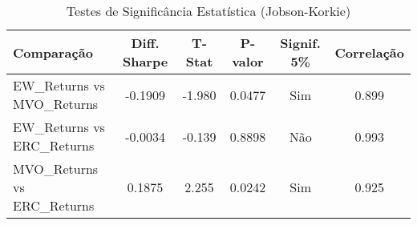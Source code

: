 
\begin{table}[H]
\centering
\caption{Testes de Significância Estatística (Jobson-Korkie)}
\label{tab:testes_estatisticos}
\begin{tabular}{|l|c|c|c|c|c|}
\hline
\textbf{Comparação} & \textbf{Diff. Sharpe} & \textbf{T-Stat} & \textbf{P-valor} & \textbf{Signif. 5\%} & \textbf{Correlação} \\
\hline
EW_Returns vs MVO_Returns & -0.1909 & -1.980 & 0.0477 & Sim & 0.899 \\
EW_Returns vs ERC_Returns & -0.0034 & -0.139 & 0.8898 & Não & 0.993 \\
MVO_Returns vs ERC_Returns & 0.1875 & 2.255 & 0.0242 & Sim & 0.925 \\
\hline
\end{tabular}
\end{table}
